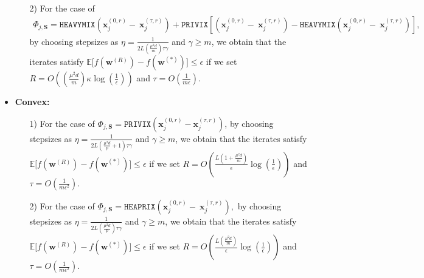 \begin{theorem}
\begin{itemize}
\begin{itemize}
          \item[2)] For the case of 
         \begin{align}
    \Phi_{j,\mathbf{S}}=\texttt{HEAVYMIX}\left(\boldsymbol{x}_j^{(0,r)}-~{\boldsymbol{x}}_{j}^{(\tau,r)}\right)+\texttt{PRIVIX}\left[\left(\boldsymbol{x}_j^{(0,r)}-~{\boldsymbol{x}}_{j}^{(\tau,r)}\right)-\texttt{HEAVYMIX}\left(\boldsymbol{x}_j^{(0,r)}-~{\boldsymbol{x}}_{j}^{(\tau,r)}\right)\right],
\end{align}
by choosing stepsizes as $\eta=\frac{1}{2L\left(\frac{\mu^2d}{m}\right)\tau\gamma}$ and $\gamma\geq m$, we obtain that the iterates satisfy $\mathbb{E}\Big[f({\boldsymbol{w}}^{(R)})-f({\boldsymbol{w}}^{(*)})\Big]\leq \epsilon$ if  we set
     $R=O\left(\left(\frac{\mu^2d}{m}\right)\kappa\log\left(\frac{1}{\epsilon}\right)\right)$ and $ \tau=O\left(\frac{1}{m\epsilon}\right)$. 
      \end{itemize}
      
     \item \textbf{Convex:}
     \begin{itemize}
         \item[1)]For the case of $\Phi_{j,\mathbf{S}}=\texttt{PRIVIX}\left(\boldsymbol{x}_j^{(0,r)}-\boldsymbol{x}_j^{(\tau,r)}\right)$, by choosing stepsizes as $\eta=\frac{1}{2L\left(\frac{\mu^2d}{p}+1\right)\tau\gamma}$ and $\gamma\geq m$, we obtain that the iterates satisfy $ \mathbb{E}\Big[f({\boldsymbol{w}}^{(R)})-f({\boldsymbol{w}}^{(*)})\Big]\leq \epsilon$ if we set
     $R=O\left(\frac{L\left(1+\frac{\mu^2d}{m}\right)}{\epsilon}\log\left(\frac{1}{\epsilon}\right)\right)$ and $ \tau=O\left(\frac{1}{m\epsilon^2}\right).$
         \item[2)] For the case of 
         $
    \Phi_{j,\mathbf{S}}=\texttt{HEAPRIX}\left(\boldsymbol{x}_j^{(0,r)}-~{\boldsymbol{x}}_{j}^{(\tau,r)}\right),$
by choosing stepsizes as $\eta=\frac{1}{2L\left(\frac{\mu^2d}{p}\right)\tau\gamma}$ and $\gamma\geq m$, we obtain that the iterates satisfy $ \mathbb{E}\Big[f({\boldsymbol{w}}^{(R)})-f({\boldsymbol{w}}^{(*)})\Big]\leq \epsilon$ if we set
     $R=O\left(\frac{L\left(\frac{\mu^2d}{m}\right)}{\epsilon}\log\left(\frac{1}{\epsilon}\right)\right)$ and $ \tau=O\left(\frac{1}{m\epsilon^2}\right).$ 
     \end{itemize}
 \end{itemize}
\end{theorem}








